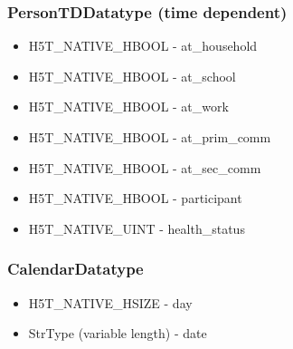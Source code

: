\documentclass{article}
\begin{document}
			\subsubsection{PersonTDDatatype (time dependent)}
				\begin{itemize}
					\item H5T\_NATIVE\_HBOOL - at\_household
					\item H5T\_NATIVE\_HBOOL - at\_school
					\item H5T\_NATIVE\_HBOOL - at\_work
					\item H5T\_NATIVE\_HBOOL - at\_prim\_comm
					\item H5T\_NATIVE\_HBOOL - at\_sec\_comm
					\item H5T\_NATIVE\_HBOOL - participant

					\item H5T\_NATIVE\_UINT - health\_status
				\end{itemize}

			\subsubsection{CalendarDatatype}
				\begin{itemize}
					\item H5T\_NATIVE\_HSIZE - day
					\item StrType (variable length) - date
				\end{itemize}
\end{document}
